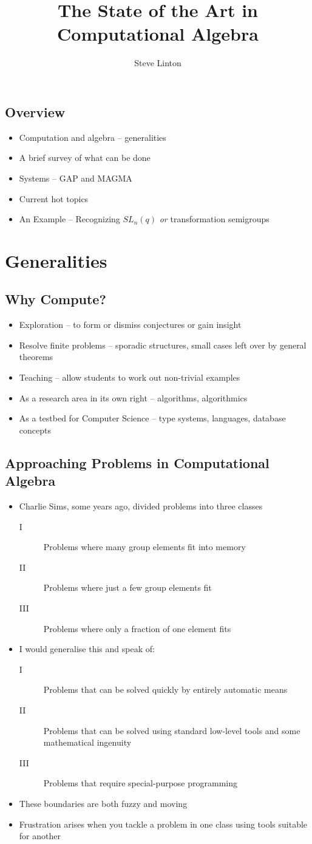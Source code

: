 \documentclass[11pt]{article}
\def\bs{\begin{slide}}
\def\es{\end{slide}}
\def\bi{\begin{itemize}}
\def\ei{\end{itemize}}
\begin{document}
\title[Computational Algebra]{The State of the Art in Computational Algebra}
\author{Steve Linton}
\titlepage
\bs
\subsection{Overview}

\bi
\item Computation and algebra -- generalities
\item A brief survey of what can be done
\item Systems -- GAP and MAGMA
\item Current hot topics
\item An Example -- Recognizing $SL_n(q)$ \textit{or} transformation semigroups
\ei
\es
\section{Generalities}
\bs
\subsection{Why Compute?}
\bi
\item Exploration -- to form or dismiss conjectures or gain insight
\item Resolve finite problems -- sporadic structures, small cases left
over by general theorems
\item Teaching -- allow students to work out non-trivial examples
\item As a research area in its own right -- algorithms, algorithmics
\item As a testbed for Computer Science -- type systems, languages,
database concepts
\ei
\es
\bs
\subsection{Approaching Problems in Computational Algebra}

\bi
\item Charlie Sims, some years ago, divided problems into three
classes
\begin{description}
\item[I] Problems where many group elements fit into memory
\item[II] Problems where just a few group elements fit
\item[III] Problems where only a fraction of one element fits
\end{description}
\item I would generalise this and speak of:
\begin{description}
\item[I] Problems that can be solved quickly by entirely automatic
means
\item[II] Problems that can be solved using standard
low-level tools and some mathematical ingenuity
\item[III] Problems that require special-purpose programming
\end{description}
\item These boundaries are both fuzzy and moving
\item Frustration arises when you tackle a problem in one class using
tools suitable for another
\ei
\es
\end{document}

